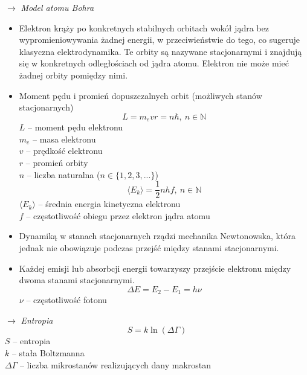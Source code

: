 \documentclass[12pt]{article}
\newenvironment{wzor}[1]{\par{\Large $\longrightarrow$ \textit{#1}}}
    {\newline {\color{grey} \rule{\linewidth}{0.3pt}}}
\begin{document}
\begin{wzor}{Model atomu Bohra}
    \begin{itemize}
        \item Elektron krąży po konkretnych stabilnych orbitach wokół jądra
            bez wypromieniowywania żadnej energii, w przeciwieństwie do tego,
            co sugeruje klasyczna elektrodynamika. Te orbity są nazywane stacjonarnymi
            i znajdują się w konkretnych odległościach od jądra atomu. Elektron
            nie może mieć żadnej orbity pomiędzy nimi.
        \item Moment pędu i promień dopuszczalnych orbit (możliwych stanów stacjonarnych)
            \begin{equation}
                L = m_e v r = n\hbar, \: n \in \mathbb{N}
            \end{equation}
            $L$ -- moment pędu elektronu\\
            $m_e$ -- masa elektronu\\
            $v$ -- prędkość elektronu\\
            $r$ -- promień orbity\\
            $n$ -- liczba naturalna ($n \in \{1, 2, 3, ...\}$)
            \begin{equation}
                \langle E_k \rangle = \frac{1}{2}nhf, \: n \in \mathbb{N}
            \end{equation}
            $\langle E_k \rangle$ -- średnia energia kinetyczna elektronu\\
            $f$ -- częstotliwość obiegu przez elektron jądra atomu
    \newpage
    
    \item Dynamiką w stanach stacjonarnych rządzi mechanika Newtonowska,
        która jednak nie obowiązuje podczas przejść między stanami stacjonarnymi.
    \item Każdej emisji lub absorbcji energii towarzyszy przejście elektronu
        między dwoma stanami stacjonarnymi.
        \begin{equation}
            \Delta E = E_2 - E_1 = h \nu
        \end{equation}
        $\nu$ -- częstotliwość fotonu
    \end{itemize}
\end{wzor}

\begin{wzor}{Entropia}
    \begin{equation}
        S = k \ln(\Delta \Gamma)
    \end{equation}
    $S$ -- entropia\\
    $k$ -- stała Boltzmanna\\
    $\Delta\Gamma$ -- liczba mikrostanów realizujących dany makrostan
\end{wzor}
\end{document}

